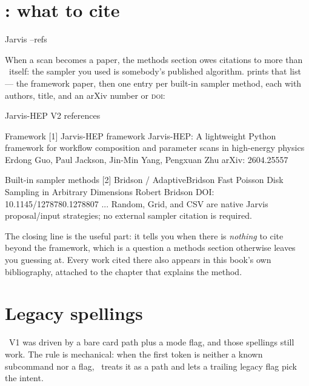 \section{: what to cite}
\label{sec:cli-refs}

\begin{terminal}
\begin{jcmd}
Jarvis --refs
\end{jcmd}
\end{terminal}

When a scan becomes a paper, the methods section owes citations to more than \Jtwo\
itself: the sampler you used is somebody's published algorithm.
 prints that list --- the framework paper, then one entry per built-in
sampler method, each with authors, title, and an arXiv number or \textsc{doi}:

\begin{terminal}
\begin{jout}
Jarvis-HEP V2 references

Framework
[1] Jarvis-HEP framework
    Jarvis-HEP: A lightweight Python framework for workflow composition and
    parameter scans in high-energy physics
    Erdong Guo, Paul Jackson, Jin-Min Yang, Pengxuan Zhu
    arXiv: 2604.25557

Built-in sampler methods
[2] Bridson / AdaptiveBridson
    Fast Poisson Disk Sampling in Arbitrary Dimensions
    Robert Bridson
    DOI: 10.1145/1278780.1278807
...
Random, Grid, and CSV are native Jarvis proposal/input strategies; no external
sampler citation is required.
\end{jout}
\end{terminal}

The closing line is the useful part: it tells you when there is \emph{nothing} to cite
beyond the framework, which is a question a methods section otherwise leaves you
guessing at. Every work cited there also appears in this book's own bibliography,
attached to the chapter that explains the method.

\section{Legacy spellings}
\label{sec:cli-legacy}

\Jarvis\ V1 was driven by a bare card path plus a mode flag, and those spellings still
work. The rule is mechanical: when the first token is neither a known subcommand nor a
flag, \Jtwo\ treats it as a path and lets a trailing legacy flag pick the intent.

